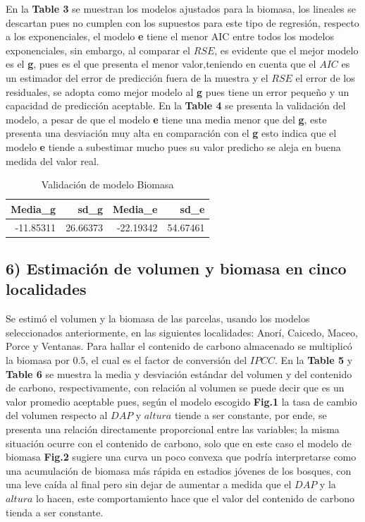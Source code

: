 \documentclass[9pt,onecolumn,twoside,]{pinp}
\begin{document}
En la \textbf{Table 3} se muestran los modelos ajustados para la
biomasa, los lineales se descartan pues no cumplen con los supuestos
para este tipo de regresión, respecto a los exponenciales, el modelo
\textbf{e} tiene el menor AIC entre todos los modelos exponenciales, sin
embargo, al comparar el \(RSE\), es evidente que el mejor modelo es el
\textbf{g}, pues es el que presenta el menor valor,teniendo en cuenta
que el \(AIC\) es un estimador del error de predicción fuera de la
muestra y el \(RSE\) el error de los residuales, se adopta como mejor
modelo al \textbf{g} pues tiene un error pequeño y un capacidad de
predicción aceptable. En la \textbf{Table 4} se presenta la validación
del modelo, a pesar de que el modelo \textbf{e} tiene una media menor
que del \textbf{g}, este presenta una desviación muy alta en comparación
con el \textbf{g} esto indica que el modelo \textbf{e} tiende a
subestimar mucho pues su valor predicho se aleja en buena medida del
valor real.

\begin{table}[h]

\caption{\label{tab:unnamed-chunk-25}Validación de modelo Biomasa}
\centering
\begin{tabular}[t]{r|r|r|r}
\hline
Media\_g & sd\_g & Media\_e & sd\_e\\
\hline
-11.85311 & 26.66373 & -22.19342 & 54.67461\\
\hline
\end{tabular}
\end{table}

\hypertarget{estimacuxf3n-de-volumen-y-biomasa-en-cinco-localidades}{%
\subsection{6) Estimación de volumen y biomasa en cinco
localidades}\label{estimacuxf3n-de-volumen-y-biomasa-en-cinco-localidades}}

Se estimó el volumen y la biomasa de las parcelas, usando los modelos
seleccionados anteriormente, en las siguientes localidades: Anorí,
Caicedo, Maceo, Porce y Ventanas. Para hallar el contenido de carbono
almacenado se multiplicó la biomasa por \(0.5\), el cual es el factor de
conversión del \(IPCC\). En la \textbf{Table 5} y \textbf{Table 6} se
muestra la media y desviación estándar del volumen y del contenido de
carbono, respectivamente, con relación al volumen se puede decir que es
un valor promedio aceptable pues, según el modelo escogido
\textbf{Fig.1} la tasa de cambio del volumen respecto al \(DAP\) y
\(altura\) tiende a ser constante, por ende, se presenta una relación
directamente proporcional entre las variables; la misma situación ocurre
con el contenido de carbono, solo que en este caso el modelo de biomasa
\textbf{Fig.2} sugiere una curva un poco convexa que podría
interpretarse como una acumulación de biomasa más rápida en estadios
jóvenes de los bosques, con una leve caída al final pero sin dejar de
aumentar a medida que el \(DAP\) y la \(altura\) lo hacen, este
comportamiento hace que el valor del contenido de carbono tienda a ser
constante.
\end{document}
